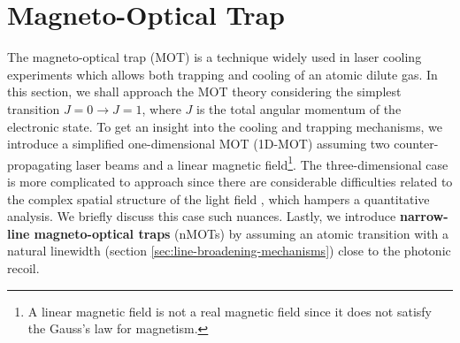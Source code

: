 %
\chapter{Magneto-Optical Trap}
\label{ch:MOT}
%

The magneto-optical trap (MOT) is a technique widely used in laser cooling experiments which allows both trapping and cooling of an atomic dilute gas. In this section, we shall approach the MOT theory \cite{krzysztof2010magneto, perrin2014doppler} considering the simplest transition $ J = 0 \rightarrow J = 1$, where $ J $ is the total angular momentum of the electronic state. To get an insight into the cooling and trapping mechanisms, we introduce a simplified one-dimensional MOT (1D-MOT) assuming two counter-propagating laser beams and a linear magnetic field\footnote{A linear magnetic field is not a real magnetic field since it does not satisfy the Gauss's law for magnetism.}. The three-dimensional case is more complicated to approach since there are considerable difficulties related to the complex spatial structure of the light field \cite{prudnikov2015three}, which hampers a quantitative analysis. We briefly discuss this case such nuances. Lastly, we introduce \textbf{narrow-line magneto-optical traps} (nMOTs) \cite{loftus2004narrow} by assuming an atomic transition with a natural linewidth (section \ref{sec:line-broadening-mechanisms}) close to the photonic recoil.


%


%


%
